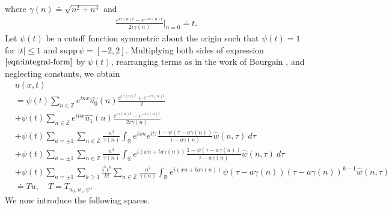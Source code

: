 \documentclass[12pt,reqno]{amsart}
\numberwithin{equation}{section}  %
\renewcommand{\cref}{\Cref}
\newcommand{\rr}{\mathbb{R}}
\newcommand{\zz}{\mathbb{Z}}
\newcommand{\wh}{\widehat}
\begin{document}
%
%
where $\gamma(n) \doteq \sqrt{n^{2} + n^{4}}$ and
%
%
\begin{equation*}
\begin{split}
  \frac{e^{i\gamma(n)t} - e^{-i\gamma(n)t}}{2 i \gamma(n)} \vert_{n=0} \doteq t.
\end{split}
\end{equation*}
%
%
Let $\psi(t)$ be a cutoff function symmetric about the 
origin such that $\psi(t) = 1$ for $|t| \le 1$ and $\text{supp} \, \psi 
= [-2, 2 ]$.
Multiplying both sides of expression
$\cref{eqn:integral-form}$ by $\psi(t)$, rearranging terms as in the work of Bourgain \cite{Bourgain:1993ju}, and neglecting constants, we obtain
%
%
%
%
%
\begin{align}
  & u(x,t)
  \label{main1-rel-term-0}
  \\
  \label{main1-rel-term-1}
  & = \psi(t) \sum_{n \in \zz} e^{inx} \wh{u_{0}}(n) \frac{e^{i\gamma(n)t} + e^{-i\gamma(n)t}}{2} 
  \\
  \label{main1-rel-term-2}
  & + \psi(t) \sum_{n \in \zz} e^{inx}
  \wh{u_{1}}(n)\frac{e^{i\gamma(n)t} - e^{-i\gamma(n)t}}{2 i \gamma(n)} 
  \\
  \label{main1-rel-term-3}
  & +  \psi(t)\sum_{a = \pm 1} \sum_{n\in \zz} \frac{n^{2}}{\gamma(n)}\int_\rr e^{ixn}  
  e^{it \tau} \frac{1 - \psi(\tau -  a\gamma(n)) 
}{\tau -  a\gamma(n)} \wh{w}(n, \tau) \ d \tau
  \\
  \label{main1-rel-term-4}
  & + \psi(t) \sum_{a = \pm 1} \sum_{n\in \zz} \frac{n^{2}}{\gamma(n)}\int_\rr e^{i(xn + 
  t a\gamma(n))}
  \frac{1- \psi(\tau -  a\gamma(n))}{\tau -  a\gamma(n)} \wh{w}(n, \tau) \ d \tau
  \\
  \label{main1-rel-term-4.5}
  & +  \psi(t) \sum_{a = \pm 1}  \sum_{k \ge 1} \frac{i^k t^k}{k!}
  \sum_{n \in \zz} \frac{n^{2}}{\gamma(n)}\int_\rr e^{i(xn + t a\gamma(n) )}
  \psi(\tau -  a\gamma(n)) (\tau -  a\gamma(n))^{k-1} \wh{w}(n, \tau)
  \\
  \label{main1-rel-term-5}
  & \doteq Tu, \quad T=T_{u_0, u_1, \psi}.
\end{align}
%
%
%
%
%
%
%
%
%
%
%
%
We now introduce the following spaces. 
%
%
\end{document}
